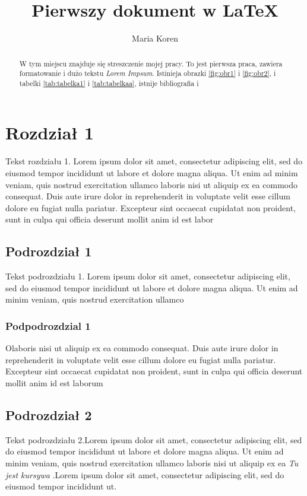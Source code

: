\documentclass[12pt,a4paper,titlepage]{article}
\title{Pierwszy dokument w \LaTeX }
\author{Maria Koren }
\begin{document}
\maketitle
\tableofcontents




\begin{abstract}
W tym miejscu znajduje się streszczenie mojej pracy. To jest pierwsza praca, zawiera formatowanie i dużo tekstu \textit{Lorem Impsum}. Istinieja obrazki \ref{fig:obr1} i \ref{fig:obr2}, i tabelki \ref{tab:tabelka1} i \ref{tab:tabelkaa}, istnije bibliografia \cite{autor1} i \cite{autor2}
\end{abstract}



\section{Rozdział 1}


Tekst rozdziału 1. Lorem ipsum dolor sit amet, consectetur adipiscing elit, sed do eiusmod tempor incididunt ut labore et dolore magna aliqua. Ut enim ad minim veniam, quis nostrud exercitation ullamco laboris nisi ut aliquip ex ea commodo consequat. Duis aute irure dolor in reprehenderit in voluptate velit esse cillum dolore eu fugiat nulla pariatur. Excepteur sint occaecat cupidatat non proident, sunt in culpa qui officia deserunt mollit anim id est labor

\subsection{Podrozdział 1} 
Tekst podrozdziału 1. Lorem ipsum dolor sit amet, consectetur adipiscing elit, sed do eiusmod tempor incididunt ut labore et dolore magna aliqua. Ut enim ad minim veniam, quis nostrud exercitation ullamco 

\subsubsection{Podpodrozdzial 1} Olaboris nisi ut aliquip ex ea commodo consequat. Duis aute irure dolor in reprehenderit in voluptate velit esse cillum dolore eu fugiat nulla pariatur. Excepteur sint occaecat cupidatat non proident, sunt in culpa qui officia deserunt mollit anim id est laborum

\subsection{Podrozdział 2}
Tekst podrozdziału 2.Lorem ipsum dolor sit amet, consectetur adipiscing elit, sed do eiusmod tempor incididunt ut labore et dolore magna aliqua. Ut enim ad minim veniam, quis nostrud exercitation ullamco laboris nisi ut aliquip ex ea \textit{Tu jest kursywa} .Lorem ipsum dolor sit amet, consectetur adipiscing elit, sed do eiusmod tempor incididunt ut.
\end{document}
